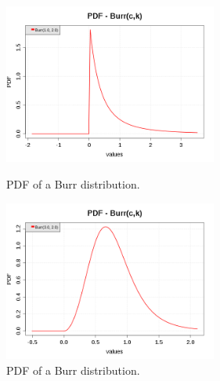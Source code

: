 \begin{figure}[H]
  \begin{minipage}{10cm}
    \begin{center}
      \includegraphics[width=7cm]{pdf_Burr_1.png}
      \caption{PDF of a Burr distribution.}
      \label{PDFBurr1}
    \end{center}
  \end{minipage}
  \hfill
  \begin{minipage}{10cm}
    \begin{center}
      \includegraphics[width=7cm]{pdf_Burr_2.png}
      \caption{PDF of a Burr distribution.}
      \label{PDFBurr2}
    \end{center}
  \end{minipage}
\end{figure}


